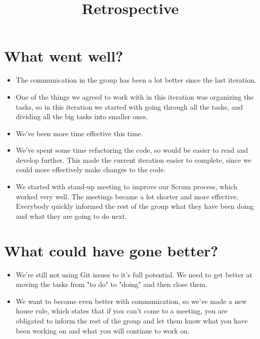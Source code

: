 \documentclass{article}
\title{Retrospective}
\begin{document}
\date{}
\maketitle
{}
\section*{What went well?}
\begin{itemize}
\item The communication in the group has been a lot better since the last iteration.
\item One of the things we agreed to work with in this iteration was organizing the tasks, so in this iteration we started with going through all the tasks, and dividing all the big tasks into smaller ones.
\item We've been more time effective this time.
\item We've spent some time refactoring the code, so would be easier to read and develop further. This made the current iteration easier to complete, since we could more effectively make changes to the code.
\item We started with stand-up meeting to improve our Scrum process, which worked very well. The meetings became a lot shorter and more effective. Everybody quickly informed the rest of the group what they have been doing and what they are going to do next. 
\end{itemize}
\section*{What could have gone better?}
\begin{itemize}
\item We're still not using Git issues to it's full potential. We need to get better at moving the tasks from "to do" to "doing" and then close them.
\item We want to become even better with communication, so we've made a new house rule, which states that if you can't come to a meeting, you are obligated to inform the rest of the group and let them know what you have been working on and what you will continue to work on.
\end{itemize}
\end{document}
